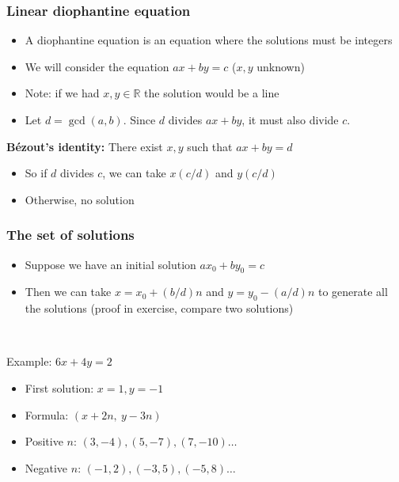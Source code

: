 \documentclass[12pt]{beamer}
\begin{document}
\begin{frame}
\frametitle{Linear diophantine equation}
\begin{itemize}
\item A diophantine equation is an equation where the solutions must be integers
\item We will consider the equation $ax+by=c$ ($x,y$ unknown)
\item Note: if we had $x,y \in \mathbb{R}$ the solution would be a line
\item Let $d = \gcd(a,b)$. Since $d$ divides $ax+by$, it must also divide $c$.
\end{itemize}

\textbf{Bézout's identity:} There exist $x,y$ such that $ax+by=d$

\begin{itemize}
\item So if $d$ divides $c$, we can take $x(c/d)$ and $y(c/d)$
\item Otherwise, no solution
\end{itemize}
\end{frame}

\begin{frame}
\frametitle{The set of solutions}
\begin{itemize}
\item Suppose we have an initial solution $ax_0+by_0=c$
\item Then we can take $x=x_0+(b/d)n$ and $y=y_0-(a/d)n$ to generate all the solutions (proof in exercise, compare two solutions)
\end{itemize}

~

Example: $6x+4y = 2$
\begin{itemize}
\item First solution: $x=1, y=-1$
\item Formula: $(x+2n,\ y-3n)$
\item Positive $n$: $(3,-4), (5,-7), (7,-10) \ldots$
\item Negative $n$: $(-1, 2), (-3, 5), (-5, 8) \ldots$
\end{itemize}
\end{frame}

\newcommand{\blue}{\textcolor{blue}}
\newcommand{\red}{\textcolor{red}}
\end{document}
